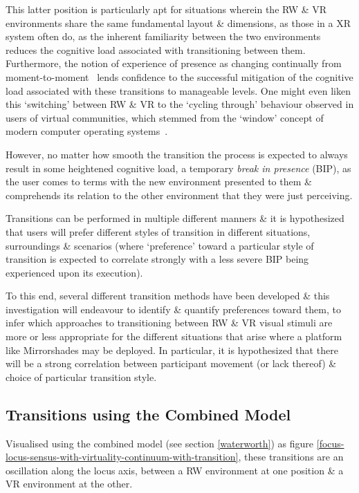This latter position is particularly apt for situations wherein the RW \& VR environments share the same fundamental layout \& dimensions, as those in a XR system often do, as the inherent familiarity between the two environments reduces the cognitive load associated with transitioning between them. Furthermore, the notion of experience of presence as changing continually from moment-to-moment~\cite{Heeter2003, Ijsselsteijn1998} lends confidence to the successful mitigation of the cognitive load associated with these transitions to manageable levels. One might even liken this `switching' between RW \& VR to the `cycling through' behaviour observed in users of virtual communities, which stemmed from the `window' concept of modern computer operating systems~\cite{Turkle2004}.

However, no matter how smooth the transition the process is expected to always result in some heightened cognitive load, a temporary \textit{break in presence}\breakinpresencefootnote{} (BIP), as the user comes to terms with the new environment presented to them \& comprehends its relation to the other environment that they were just perceiving.

Transitions can be performed in multiple different manners \& it is hypothesized that users will prefer different styles of transition in different situations, surroundings \& scenarios (where `preference' toward a particular style of transition is expected to correlate strongly with a less severe BIP being experienced upon its execution).

To this end, several different transition methods have been developed \& this investigation will endeavour to identify \& quantify preferences toward them, to infer which approaches to transitioning between RW \& VR visual stimuli are more or less appropriate for the different situations that arise where a platform like Mirrorshades may be deployed. In particular, it is hypothesized that there will be a strong correlation between participant movement (or lack thereof) \& choice of particular transition style.

\subsection{Transitions using the Combined Model}
Visualised using the combined model (see section \ref{waterworth}) as figure \ref{focus-locus-sensus-with-virtuality-continuum-with-transition}, these transitions are an oscillation along the locus axis, between a RW environment at one position \& a VR environment at the other.

